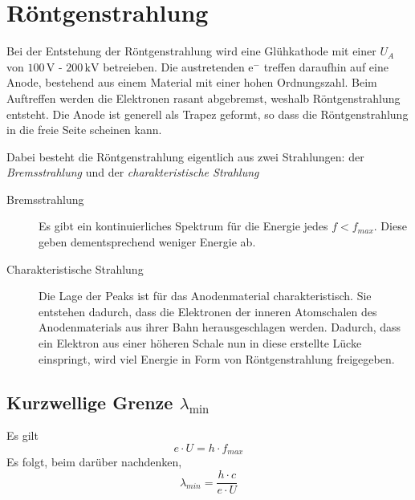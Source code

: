 \documentclass{article}
\begin{document}
\section{Röntgenstrahlung}
Bei der Entstehung der Röntgenstrahlung wird eine Glühkathode mit einer $U_A$ von $100\, \text{V}$ - $200\, \text{kV}$ betreieben. Die austretenden e$^-$ treffen daraufhin auf eine Anode, bestehend aus einem Material mit einer hohen Ordnungszahl. Beim Auftreffen werden die Elektronen rasant abgebremst, weshalb Röntgenstrahlung entsteht. Die Anode ist generell als Trapez geformt, so dass die Röntgenstrahlung in die freie Seite scheinen kann.
 
Dabei besteht die Röntgenstrahlung eigentlich aus zwei Strahlungen: der \emph{Bremsstrahlung} und der \emph{charakteristische Strahlung}
\begin{description} 
 \item[Bremsstrahlung] Es gibt ein kontinuierliches Spektrum für die Energie jedes $f < f_{max}$. Diese geben dementsprechend weniger Energie ab.
 \item[Charakteristische Strahlung] Die Lage der Peaks ist für das Anodenmaterial charakteristisch. Sie entstehen dadurch, dass die Elektronen der inneren Atomschalen des Anodenmaterials aus ihrer Bahn herausgeschlagen werden. Dadurch, dass ein Elektron aus einer höheren Schale nun in diese erstellte Lücke einspringt, wird viel Energie in Form von Röntgenstrahlung freigegeben.
\end{description} 
 
\subsection{Kurzwellige Grenze $\lambda_{\text{min}}$} 
Es gilt 
\[
 e \cdot U = h \cdot f_{max} 
\]
Es folgt, beim darüber nachdenken,
\[
 \lambda_{min} = \frac{h \cdot c}{e \cdot U} 
\] 
 
\end{document}

